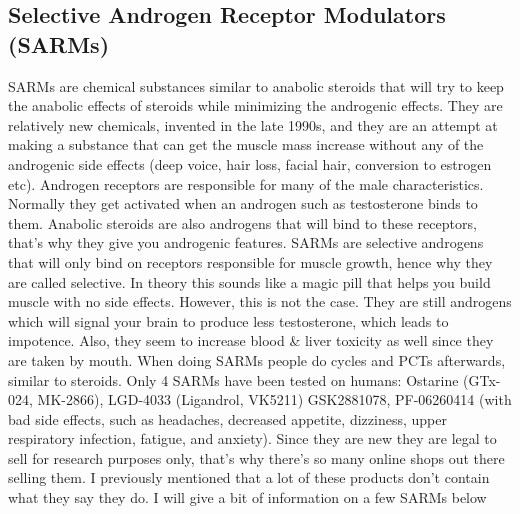 \documentclass[openany, 12pt]{book}
\begin{document}
        \FloatBarrier
        
        \subsection{Selective Androgen Receptor Modulators (SARMs)}

        SARMs are chemical substances similar to anabolic steroids that will try to keep the anabolic effects of steroids while minimizing the androgenic effects.
        They are relatively new chemicals, invented in the late 1990s, and they are an attempt at making a substance that can get the muscle mass increase without
        any of the androgenic side effects (deep voice, hair loss, facial hair, conversion to estrogen etc).
        Androgen receptors are responsible for many of the male characteristics. Normally they get activated when an androgen such as testosterone
        binds to them. Anabolic steroids are also androgens that will bind to these receptors, that's why they give you androgenic features.
        SARMs are selective androgens that will only bind on receptors responsible for muscle growth, hence why they are called selective. In theory this sounds like a magic pill
        that helps you build muscle with no side effects. However, this is not the case. They are still androgens which will signal your brain to produce less testosterone, which
        leads to impotence. Also, they seem to increase blood \& liver toxicity as well since they are taken by mouth. When doing SARMs people do cycles and PCTs afterwards, similar to steroids.
        Only 4 SARMs have been tested on humans: Ostarine (GTx-024, MK-2866), LGD-4033 (Ligandrol, VK5211)
        GSK2881078, PF-06260414 (with bad side effects, such as headaches, decreased appetite, dizziness, upper respiratory infection, fatigue, and anxiety).
        Since they are new they are legal to sell for research purposes only, that's why there's so many online shops out there selling them. I previously mentioned that a lot of these
        products don't contain what they say they do. I will give a bit of information on a few SARMs below
\end{document}
